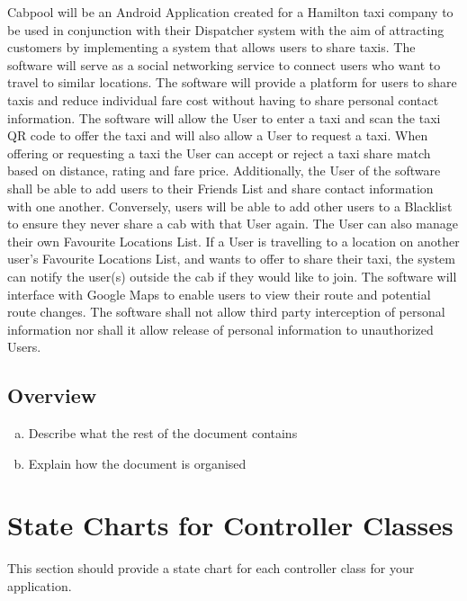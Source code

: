 \documentclass[english]{article}
\begin{document}
Cabpool will be an Android Application created for a Hamilton taxi company to be used in conjunction with their Dispatcher system with the aim of attracting customers by implementing a system that allows users to share taxis. The software will serve as a social networking service to connect users who want to travel to similar locations. The software will provide a platform for users to share taxis and reduce individual fare cost without having to share personal contact information. The software will allow the User to enter a taxi and scan the taxi QR code to offer the taxi and will also allow a User to request a taxi. When offering or requesting a taxi the User can accept or reject a taxi share match based on distance, rating and fare price. \newline
\newline
Additionally, the User of the software shall be able to add users to their Friends List and share contact information with one another. Conversely, users will be able to add other users to a Blacklist to ensure they never share a cab with that User again. The User can also manage their own Favourite Locations List. If a User is travelling to a location on another user's Favourite Locations List, and wants to offer to share their taxi, the system can notify the user(s) outside the cab if they would like to join. The software will interface with Google Maps to enable users to view their route and potential route changes. The software shall not allow third party interception of personal information nor shall it allow release of personal information to unauthorized Users.

\subsection{Overview}
\label{sub:overview}
\begin{enumerate}[a)]
    \item Describe what the rest of the document contains 
    \item Explain how the document is organised
\end{enumerate}



\section{State Charts for Controller Classes}
\label{sec:state_charts_for_controller_classes}
This section should provide a state chart for each controller class for your application.
\end{document}

